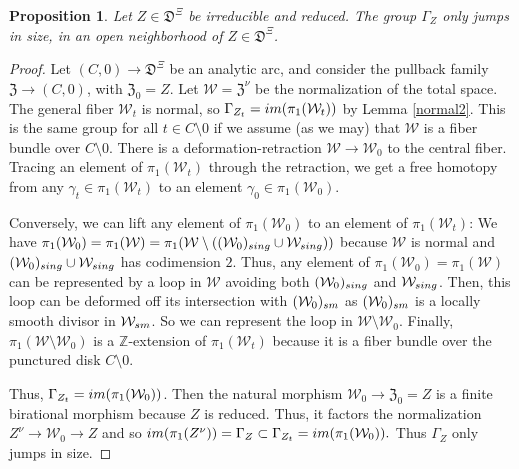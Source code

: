 \documentclass[10pt,a4paper]{amsart}
\newtheorem{proposition}{Proposition}
\newcommand\Z{{\mathbb Z}}
\newcommand\bP{{\mathbb P}}
\newcommand\cW{{\mathcal W}}
\newcommand\cZ{{\mathcal Z}}
\newcommand\fD{{\mathfrak D}}
\newcommand\fZ{{\mathfrak Z}}
\begin{document}
\begin{proposition}\label{pi1} Let $Z\in \fD^{\Xi}$ be irreducible
and reduced. The group $\Gamma_Z$ only jumps in size,
in an open neighborhood of $Z\in \fD^{\Xi}$.
\end{proposition}

\begin{proof}
Let $(C,0)\to \fD^{\Xi}$
be an analytic arc, and consider the pullback
family $\fZ\to (C,0)$, with $\fZ_0=Z$. Let $\cW = \fZ^\nu$
be the normalization of the total space. The general fiber $\cW_t$ is normal, so
$\Gamma_{Z_t} = {\rm im}(\pi_1(\cW_t))$ by Lemma
\ref{normal2}.
This is the same group for all $t\in C\setminus 0$
if we assume (as we may) that $\cW$ is a fiber bundle
over $C\setminus 0$. There is a deformation-retraction
$\cW\to \cW_0$ to the central
fiber. Tracing an element of $\pi_1(\cW_t)$ through the
retraction, we get a free homotopy from any $\gamma_t\in \pi_1(\cW_t)$
to an element $\gamma_0\in \pi_1(\cW_0)$.

Conversely, we can lift any element of $\pi_1(\cW_0)$ 
to an element of $\pi_1(\cW_t)$: We have $\pi_1(\cW_0)=\pi_1(\cW) = 
\pi_1(\cW\setminus ((\cW_0)_{\rm sing}\cup \cW_{\rm sing}))$ because $\cW$ is
normal and $(\cW_0)_{\rm sing}\cup \cW_{\rm sing}$ 
has codimension $2$. Thus, any element of $\pi_1(\cW_0)=\pi_1(\cW)$ can
be represented by a loop in $\cW$ avoiding both $(\cW_0)_{\rm sing}$
and $\cW_{\rm sing}$. Then, 
this loop can be deformed off its intersection with $(\cW_0)_{\rm sm}$
as $(\cW_0)_{\rm sm}$ is a locally smooth divisor in $\cW_{\rm sm}$.
So we can represent the loop in $\cW\setminus \cW_0$.
Finally, $\pi_1(\cW\setminus \cW_0)$ is a $\Z$-extension of $\pi_1(\cW_t)$
because it is a fiber bundle over the punctured disk $C\setminus 0$.

Thus, $\Gamma_{Z_t}={\rm im}(\pi_1(\cW_0))$.
Then the natural morphism
$\cW_0\to \fZ_0=Z$
is a finite birational
morphism because $Z$ is reduced.
Thus, it factors the normalization
$Z^\nu \to \cW_0 \to Z$
and so ${\rm im}(\pi_1(Z^\nu))=
\Gamma_{Z}\subset \Gamma_{Z_t}= {\rm im}(\pi_1(\cW_0)).$ Thus
$\Gamma_Z$ only jumps in size.
\end{proof}
\end{document}
